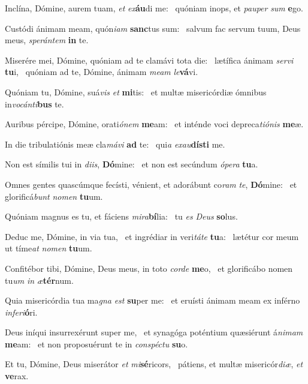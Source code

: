 \item Inclína, Dómine, aurem tuam, \textit{et} \textit{ex}\textbf{áu}di me:~\psstar{} quóniam inops, et \textit{pauper} \textit{sum} \textbf{e}go.
\item Custódi ánimam meam, quón\textit{iam} \textbf{sanc}tus sum:~\psstar{} salvum fac servum tuum, Deus meus, \textit{sperántem} \textbf{in} te.
\item Miserére mei, Dómine, quóniam ad te clamávi tota die:~\pscross{} lætífica ánimam \textit{servi} \textbf{tu}i,~\psstar{} quóniam ad te, Dómine, ánimam \textit{meam} \textit{le}\textbf{vá}vi.
\item Quóniam tu, Dómine, suá\textit{vis} \textit{et} \textbf{mi}tis:~\psstar{} et multæ misericórdiæ ómnibus in\textit{vocánti}\textbf{bus} te.
\item Auribus pércipe, Dómine, orati\textit{ónem} \textbf{me}am:~\psstar{} et inténde voci depreca\textit{tiónis} \textbf{me}æ.
\item In die tribulatiónis meæ cla\textit{mávi} \textbf{ad} te:~\psstar{} qui\textit{a} \textit{exau}\textbf{dís}\textbf{ti} me.
\item Non est símilis tui in \textit{diis}, \textbf{Dó}mine:~\psstar{} et non est secúndum \textit{ópera} \textbf{tu}a.
\item Omnes gentes quascúmque fecísti, vénient, et adorábunt co\textit{ram} \textit{te}, \textbf{Dó}mine:~\psstar{} et glorificá\textit{bunt} \textit{nomen} \textbf{tu}um.
\item Quóniam magnus es tu, et fáciens \textit{mira}\textbf{bí}lia:~\psstar{} tu \textit{es} \textit{Deus} \textbf{so}lus.
\item Deduc me, Dómine, in via tua,~\pscross{} et ingrédiar in veri\textit{táte} \textbf{tu}a:~\psstar{} lætétur cor meum ut tíme\textit{at} \textit{nomen} \textbf{tu}um.
\item Confitébor tibi, Dómine, Deus meus, in toto \textit{corde} \textbf{me}o,~\psstar{} et glorificábo nomen tu\textit{um} \textit{in} \textit{æ}\textbf{tér}num.
\item Quia misericórdia tua ma\textit{gna} \textit{est} \textbf{su}per me:~\psstar{} et eruísti ánimam meam ex inférno \textit{inferi}\textbf{ó}ri.
\item Deus iníqui insurrexérunt super me,~\pscross{} et synagóga poténtium quæsiérunt á\textit{nimam} \textbf{me}am:~\psstar{} et non proposuérunt te in \textit{conspéctu} \textbf{su}o.
\item Et tu, Dómine, Deus miserátor \textit{et} \textit{mi}\textbf{sé}ricors,~\psstar{} pátiens, et multæ misericór\textit{diæ}, \textit{et} \textbf{ve}rax.
